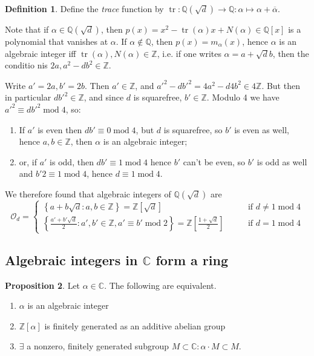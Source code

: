 \documentclass{article}
\newcommand{\Z}{\mathbb{Z}}
\newcommand{\Q}{\mathbb{Q}}
\newcommand{\C}{\mathbb{C}}
\newcommand{\tr}{\operatorname{tr}}
\newcommand{\Mod}{\operatorname{mod}}
\newcommand{\ri}{\mathcal{O}}
\theoremstyle{definition}
\newtheorem{defn}{Definition}[subsection]
\newtheorem{prop}[defn]{Proposition}
\begin{document}
\begin{defn}
Define the \textit{trace} function by $\tr:\Q\left(\sqrt d\right)\rightarrow \Q:\alpha\mapsto\alpha+\overline\alpha$.
\end{defn}

Note that if $\alpha\in\Q\left(\sqrt d\right)$, then $p(x)=x^2-\tr(\alpha)x+N(\alpha)\in\Q[x]$ is a polynomial that vanishes at $\alpha$. If $\alpha\notin\Q$, then $p(x)=m_\alpha(x)$, hence $\alpha$ is an algebraic integer iff $\tr(\alpha),N(\alpha)\in\Z$, i.e. if one writes $\alpha=a+\sqrt d b$, then the conditio nis $2a,a^2-db^2\in\Z$.

Write $a'=2a,b'=2b$. Then $a'\in\Z$, and $a'^2-db'^2=4a^2-d4b^2\in 4\Z$. But then in particular $db'^2\in\Z$, and since $d$ is squarefree, $b'\in\Z$. Modulo 4 we have $a'^2\equiv db'^2\Mod 4$, so:
\begin{enumerate}
\item If $a'$ is even then $db'\equiv 0\Mod 4$, but $d$ is squarefree, so $b'$ is even as well, hence $a,b\in\Z$, then $\alpha$ is an algebraic integer;
\item or, if $a'$ is odd, then $db'\equiv 1\Mod 4$ hence $b'$ can't be even, so $b'$ is odd as well and $b'2\equiv 1\Mod 4$, hence $d\equiv 1\Mod 4$.
\end{enumerate}

We therefore found that algebraic integers of $\Q\left(\sqrt d\right)$ are
\[
\ri_d=\left\{
\begin{aligned}
\left\{a+b\sqrt d:a,b\in\Z\right\}=\Z\left[\sqrt d\right] \qquad&\text{if }d\neq 1\Mod 4 \\
\left\{\frac{a'+b'\sqrt d}{2}:a',b'\in\Z,a'\equiv b'\Mod 2\right\}=\Z\left[\frac{1+\sqrt d}{2}\right]\qquad&\text{if }d=1\Mod 4
\end{aligned}
\right.
\]

\subsection{Algebraic integers in $\C$ form a ring}
\begin{prop}
\label{prop:intstab}
Let $\alpha\in\C$. The following are equivalent.
\begin{enumerate}
\item $\alpha$ is an algebraic integer
\item $\Z[\alpha]$ is finitely generated as an additive abelian group
\item $\exists$ a nonzero, finitely generated subgroup $M\subset\C:\alpha\cdot M\subset M$.
\end{enumerate}
\end{prop}
\end{document}
